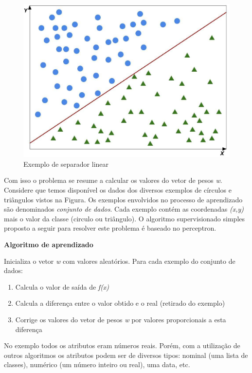 \begin{figure}[h!]
  \includegraphics[width=\linewidth]{images/conceitosbasicos02.eps}
  \caption{Exemplo de separador linear}
  \label{fig:conceitosbasicos02}
\end{figure}

Com isso o problema se resume a calcular os valores do vetor de pesos \textit{w}.
Considere que temos disponível os dados dos diversos exemplos de círculos e triângulos vistos na Figura.
Os exemplos envolvidos no processo de aprendizado são denominados \textit{conjunto de dados}.
Cada exemplo contém as coordenadas \textit{(x,y)} mais o valor da classe (circulo ou triângulo).
O algoritmo supervisionado simples proposto a seguir para resolver este problema é baseado no perceptron.
\\
\newpage
\begin{center}
\textbf{Algoritmo de aprendizado}
\end{center}
\hfill \break
Inicializa o vetor \textit{w} com valores aleatórios.
Para cada exemplo do conjunto de dados:
\begin{enumerate}
\item Calcula o valor de saída de \textit{f(x)}
\item Calcula a diferença entre o valor obtido e o real (retirado do exemplo) 
\item Corrige os valores do vetor de pesos \textit{w} por valores proporcionais a esta diferença
\end{enumerate}
\hfill \break

No exemplo todos os atributos eram números reais.
Porém, com a utilização de outros algoritmos os atributos podem ser de diversos tipos: nominal (uma lista de classes), numérico (um número inteiro ou real), uma data, etc.

